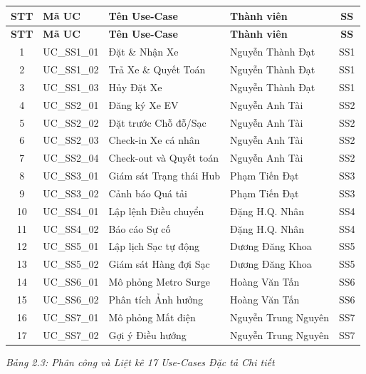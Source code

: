 \documentclass[12pt,a4paper]{report}
\begin{document}
\renewcommand{\arraystretch}{1.4}
\begin{longtable}{|c|l|l|l|c|}
    \hline
    \textbf{STT} & \textbf{Mã UC} & \textbf{Tên Use-Case} & \textbf{Thành viên} & \textbf{SS} \\
    \hline
    \endfirsthead
    \hline
    \textbf{STT} & \textbf{Mã UC} & \textbf{Tên Use-Case} & \textbf{Thành viên} & \textbf{SS} \\
    \hline
    \endhead

    1 & UC\_SS1\_01 & Đặt \& Nhận Xe & Nguyễn Thành Đạt & SS1 \\
    \hline
    2 & UC\_SS1\_02 & Trả Xe \& Quyết Toán & Nguyễn Thành Đạt & SS1 \\
    \hline
    3 & UC\_SS1\_03 & Hủy Đặt Xe & Nguyễn Thành Đạt & SS1 \\
    \hline
    4 & UC\_SS2\_01 & Đăng ký Xe EV & Nguyễn Anh Tài & SS2 \\
    \hline
    5 & UC\_SS2\_02 & Đặt trước Chỗ đỗ/Sạc & Nguyễn Anh Tài & SS2 \\
    \hline
    6 & UC\_SS2\_03 & Check-in Xe cá nhân & Nguyễn Anh Tài & SS2 \\
    \hline
    7 & UC\_SS2\_04 & Check-out và Quyết toán & Nguyễn Anh Tài & SS2 \\
    \hline
    8 & UC\_SS3\_01 & Giám sát Trạng thái Hub & Phạm Tiến Đạt & SS3 \\
    \hline
    9 & UC\_SS3\_02 & Cảnh báo Quá tải & Phạm Tiến Đạt & SS3 \\
    \hline
    10 & UC\_SS4\_01 & Lập lệnh Điều chuyển & Đặng H.Q. Nhân & SS4 \\
    \hline
    11 & UC\_SS4\_02 & Báo cáo Sự cố & Đặng H.Q. Nhân & SS4 \\
    \hline
    12 & UC\_SS5\_01 & Lập lịch Sạc tự động & Dương Đăng Khoa & SS5 \\
    \hline
    13 & UC\_SS5\_02 & Giám sát Hàng đợi Sạc & Dương Đăng Khoa & SS5 \\
    \hline
    14 & UC\_SS6\_01 & Mô phỏng Metro Surge & Hoàng Văn Tấn & SS6 \\
    \hline
    15 & UC\_SS6\_02 & Phân tích Ảnh hưởng & Hoàng Văn Tấn & SS6 \\
    \hline
    16 & UC\_SS7\_01 & Mô phỏng Mất điện & Nguyễn Trung Nguyên & SS7 \\
    \hline
    17 & UC\_SS7\_02 & Gợi ý Điều hướng & Nguyễn Trung Nguyên & SS7 \\
    \hline
\end{longtable}
\begin{center}\textit{Bảng 2.3: Phân công và Liệt kê 17 Use-Cases Đặc tả Chi tiết}\end{center}
\vspace{0.5cm}
\end{document}
